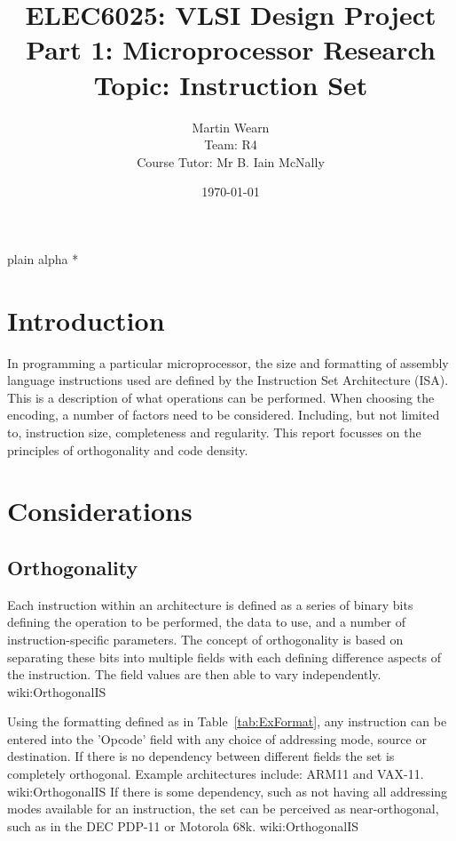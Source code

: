 \documentclass[12pt,a4paper]{article}
\title{ELEC6025: VLSI Design Project \\Part 1: Microprocessor Research\\Topic: Instruction Set}
\author{Martin Wearn\\ Team: R4\\Course Tutor: Mr B. Iain McNally}
\date{\today}
\begin{document}
{plain}
{alpha}
\nocite{bibl}{*} %

\begin{titlepage}
\maketitle
\end{titlepage}

\tableofcontents
\clearpage

\section{Introduction}
In programming a particular microprocessor, the size and formatting of assembly language instructions used are defined by the Instruction Set Architecture (ISA). This is a description of what operations can be performed. When choosing the encoding, a number of factors need to be considered. Including, but not limited to, instruction size, completeness and regularity. This report focusses on the principles of orthogonality and code density. 

\section{Considerations}

\subsection{Orthogonality}
Each instruction within an architecture is defined as a series of binary bits defining the operation to be performed, the data to use, and a number of instruction-specific parameters. The concept of orthogonality is based on separating these bits into multiple fields with each defining difference aspects of the instruction. The field values are then able to vary independently. \cite{ref}{wiki:OrthogonalIS}

Using the formatting defined as in Table~\ref{tab:ExFormat}, any instruction can be entered into the 'Opcode' field with any choice of addressing mode, source or destination. If there is no dependency between different fields the set is completely orthogonal. Example architectures include: ARM11 and VAX-11. \cite{ref}{wiki:OrthogonalIS}
If there is some dependency, such as not having all addressing modes available for an instruction, the set can be perceived as near-orthogonal, such as in the DEC PDP-11 or Motorola 68k. \cite{ref}{wiki:OrthogonalIS}
\end{document}
